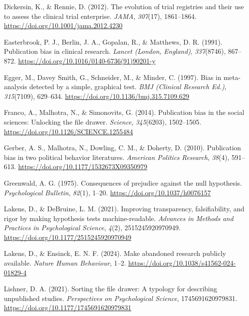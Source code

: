 \documentclass[
  ,man, a4paper,floatsintext]{apa6}
\newlength{\cslhangindent}
\newenvironment{CSLReferences}[2] %
 {\begin{list}{}{%
  \setlength{\itemindent}{0pt}
  \setlength{\leftmargin}{0pt}
  \setlength{\parsep}{0pt}
  \ifodd #1
   \setlength{\leftmargin}{\cslhangindent}
   \setlength{\itemindent}{-1\cslhangindent}
  \fi
  \setlength{\itemsep}{#2\baselineskip}}}
 {\end{list}}
\begin{document}
\begin{CSLReferences}{1}{0}
Dickersin, K., \& Rennie, D. (2012). The evolution of trial registries and their use to assess the clinical trial enterprise. \emph{JAMA}, \emph{307}(17), 1861--1864. \url{https://doi.org/10.1001/jama.2012.4230}

Easterbrook, P. J., Berlin, J. A., Gopalan, R., \& Matthews, D. R. (1991). Publication bias in clinical research. \emph{Lancet (London, England)}, \emph{337}(8746), 867--872. \url{https://doi.org/10.1016/0140-6736(91)90201-y}

Egger, M., Davey Smith, G., Schneider, M., \& Minder, C. (1997). Bias in meta-analysis detected by a simple, graphical test. \emph{BMJ (Clinical Research Ed.)}, \emph{315}(7109), 629--634. \url{https://doi.org/10.1136/bmj.315.7109.629}

Franco, A., Malhotra, N., \& Simonovits, G. (2014). Publication bias in the social sciences: {Unlocking} the file drawer. \emph{Science}, \emph{345}(6203), 1502--1505. \url{https://doi.org/10.1126/SCIENCE.1255484}

Gerber, A. S., Malhotra, N., Dowling, C. M., \& Doherty, D. (2010). Publication bias in two political behavior literatures. \emph{American Politics Research}, \emph{38}(4), 591--613. \url{https://doi.org/10.1177/1532673X09350979}

Greenwald, A. G. (1975). Consequences of prejudice against the null hypothesis. \emph{Psychological Bulletin}, \emph{82}(1), 1--20. \url{https://doi.org/10.1037/h0076157}

Lakens, D., \& DeBruine, L. M. (2021). Improving transparency, falsifiability, and rigor by making hypothesis tests machine-readable. \emph{Advances in Methods and Practices in Psychological Science}, \emph{4}(2), 2515245920970949. \url{https://doi.org/10.1177/2515245920970949}

Lakens, D., \& Ensinck, E. N. F. (2024). Make abandoned research publicly available. \emph{Nature Human Behaviour}, 1--2. \url{https://doi.org/10.1038/s41562-024-01829-4}

Lishner, D. A. (2021). Sorting the file drawer: {A} typology for describing unpublished studies. \emph{Perspectives on Psychological Science}, 1745691620979831. \url{https://doi.org/10.1177/1745691620979831}


\end{CSLReferences}
\end{document}
